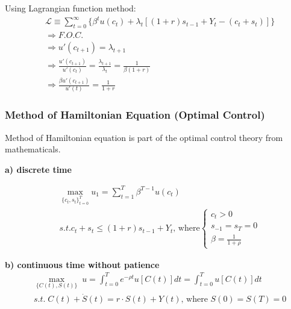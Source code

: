 \documentclass{article}
\begin{document}
Using Lagrangian function method:
\begin{align}
& \mathscr{L} \equiv \sum\limits_{t=0}^{\infty} \{\beta^{t}u(c_{t})+\lambda_{t}[(1+r)s_{t-1}+Y_{t}-(c_{t}+s_{t})]\}
\\&\Rightarrow F.O.C.
\\&\Rightarrow u'(c_{t+1})=\lambda_{t+1}
\\&\Rightarrow \frac{u'(c_{t+1})}{u'(c_{t})}=\frac{\lambda_{t+1}}{\lambda_{t}}=\frac{1}{\beta(1+r)}
\\&\Rightarrow \frac{\beta u'(c_{t+1})}{u'(t)}=\frac{1}{1+r}
\end{align}

\subsubsection{Method of Hamiltonian Equation (Optimal
Control)}\label{method-of-hamiltonian-equation-optimal-control}
Method of Hamiltonian equation is part of the optimal control theory from mathematicals.

\textbf{a) discrete time} 

\begin{equation}
\begin{split}
&\mathop{max}\limits_{\{c_{t},s_{t}\}_{t=0}^{T}} u_{1}=\sum\limits_{t=1}^{T}\beta^{T-1}u(c_{t})
\\&s.t. c_{t}+s_{t}\leqslant (1+r)s_{t-1}+Y_{t} \text{, where} \begin{cases}
c_{t}>0 \\
s_{-1}=s_{T}=0 \\
\beta=\frac{1}{1+\rho}
\end{cases}
\end{split}
\end{equation}





\textbf{b) continuous time without patience} 
\begin{equation}
\begin{split}
&\max_{\{C(t),S(t)\}} \; u=\int_{t=0}^{T}e^{-\rho t}u[C(t)]dt=\int_{t=0}^{T}u[C(t)]dt
\\& s.t. \; C(t)+\dot{S}(t)=r \cdot S(t)+Y(t) \text{, where } S(0)=S(T)=0
\end{split}
\end{equation}
\end{document}
